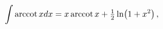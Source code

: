 \[\int\mathop{\mathrm{arccot}\/}\nolimits xdx=x\mathop{\mathrm{arccot}\/}%
\nolimits x+\tfrac{1}{2}\mathop{\ln\/}\nolimits\!\left(1+x^{2}\right),\]